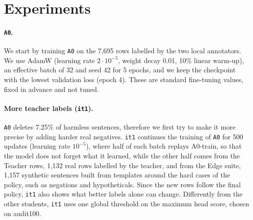 \documentclass[11pt]{article}
\begin{document}

\section{Experiments}
\label{sec:results}



\paragraph{\texttt{A0}.} We start by training \texttt{A0} on the 7,695 rows labelled by the two local annotators. We use AdamW (learning rate $2\cdot10^{-5}$, weight decay 0.01, 10\% linear warm-up), an effective batch of 32 and seed 42 for 5 epochs, and we keep the checkpoint with the lowest validation loss (epoch 4). These are standard fine-tuning values, fixed in advance and not tuned.

\paragraph{More teacher labels (\texttt{it1}).} \texttt{A0} deletes 7.25\% of harmless sentences, therefore we first try to make it more precise by adding harder real negatives. \texttt{it1} continues the training of \texttt{A0} for 500 updates (learning rate $10^{-5}$), where half of each batch replays A0-train, so that the model does not forget what it learned, while the other half comes from the Teacher rows, 1,132 real rows labelled by the teacher, and from the Edge suite, 1,157 synthetic sentences built from templates around the hard cases of the policy, such as negations and hypotheticals. Since the new rows follow the final policy, \texttt{it1} also shows what better labels alone can change. Differently from the other students, \texttt{it1} uses one global threshold on the maximum head score, chosen on audit100.
\end{document}
